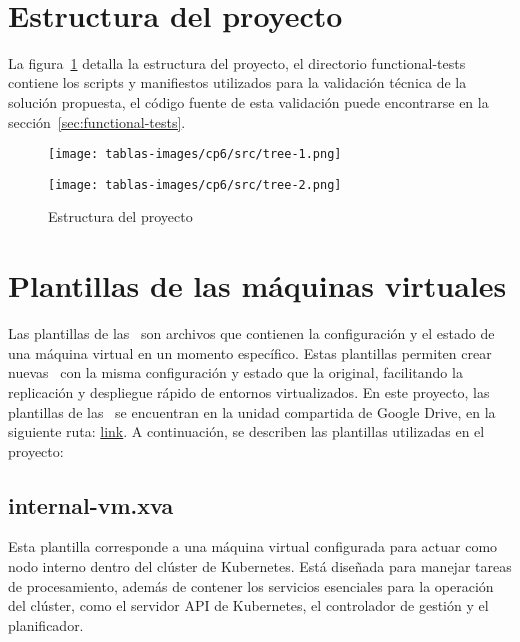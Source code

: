 \label{cap:pmv}
\mbox{}\\
\section{Estructura del proyecto}
\noindent
La figura~\ref{fig:estructura-proyecto} detalla la estructura del proyecto, el directorio functional-tests contiene los scripts y manifiestos utilizados para la validación técnica de la solución propuesta, el código fuente de esta validación puede encontrarse en la sección~\ref{sec:functional-tests}.
\begin{figure}[H]
	\centering
	\begin{minipage}{0.48\textwidth}
		\centering
		\texttt{[image: tablas-images/cp6/src/tree-1.png]}
		\label{fig:estructura-proyecto-1}
	\end{minipage}
	\hfill
	\begin{minipage}{0.48\textwidth}
		\centering
		\texttt{[image: tablas-images/cp6/src/tree-2.png]}
		\label{fig:estructura-proyecto-2}
	\end{minipage}
	\caption{Estructura del proyecto}\label{fig:estructura-proyecto}
\end{figure}

\section{Plantillas de las máquinas virtuales}\label{sec:plantillas-vm}
\noindent
Las plantillas de las \VM\ son archivos que contienen la configuración y el estado de una máquina virtual en un momento específico. Estas plantillas permiten crear nuevas \VM\ con la misma configuración y estado que la original, facilitando la replicación y despliegue rápido de entornos virtualizados. En este proyecto, las plantillas de las \VM\ se encuentran en la unidad compartida de Google Drive, en la siguiente ruta: \href{https://drive.google.com/drive/folders/1Ar2ifFR9WufCqmZMt2NMJ2OzLG9Gucas?usp=sharing}{link}. A continuación, se describen las plantillas utilizadas en el proyecto:
\subsection{internal-vm.xva}
\noindent
Esta plantilla corresponde a una máquina virtual configurada para actuar como nodo interno dentro del clúster de Kubernetes. Está diseñada para manejar tareas de procesamiento, además de contener los servicios esenciales para la operación del clúster, como el servidor API de Kubernetes, el controlador de gestión y el planificador.


